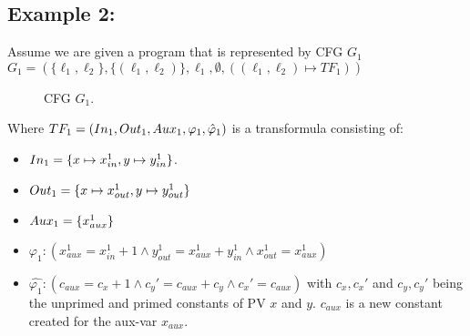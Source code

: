 \documentclass{article}
\begin{document}
	\subsection*{Example 2:}
	Assume we are given a program that is represented by CFG $G_1$ \\ $G_1 = (\{ \ell_1, \ell_2 \}, \{ (\ell_1, \ell_2)\}, \ell_1, \emptyset, ((\ell_1, \ell_2) 
	\mapsto TF_1))$
	\begin{figure}[H]
		\centering
		\caption{CFG $G_1$.}
	\end{figure}

	Where $TF_1 = (In_1, Out_1, Aux_1, \varphi_1, \hat{\varphi}_1)$ is a transformula consisting of: 
	\begin{itemize}
		\item $In_1 = \{x \mapsto x_{in}^1, y \mapsto y_{in}^1 \}$.
		\item $Out_1 = \{ x \mapsto x_{out}^1, y \mapsto y_{out}^1 \}$
		\item $Aux_1 = \{x_{aux}^1 \} $
		\item $\varphi_1: (x_{aux}^1 = x_{in}^1 + 1 \land y_{out}^1 = x_{aux}^1 + y_{in}^1 \land x_{out}^1 = x_{aux}^1)$
		\item $\hat{\varphi_1}: (c_{aux} = c_x + 1 \land c_y' = c_{aux} + c_y \land c_x' = c_{aux})$ with $c_x, c_x'$ and $c_y, c_y'$ being the unprimed and primed constants of PV $x$ and $y$. $c_{aux}$ is a new constant created for the aux-var $x_{aux}$.
	\end{itemize}
    
\end{document}
